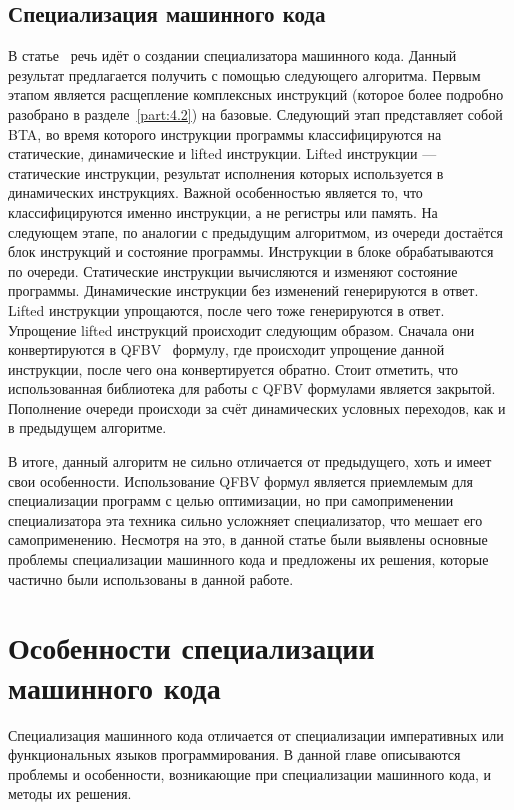 \subsection{Специализация машинного кода}
В статье~\cite{PEMC} речь идёт о создании специализатора машинного кода. Данный результат предлагается получить с помощью следующего алгоритма. Первым этапом является расщепление комплексных инструкций (которое более подробно разобрано в разделе~\ref{part:4.2}) на базовые. Следующий этап представляет собой BTA, во время которого инструкции программы классифицируются на статические, динамические и lifted инструкции. Lifted инструкции --- статические инструкции, результат исполнения которых используется в динамических инструкциях. Важной особенностью является то, что классифицируются именно инструкции, а не регистры или память. На следующем этапе, по аналогии с предыдущим алгоритмом, из очереди достаётся блок инструкций и состояние программы. Инструкции в блоке обрабатываются по очереди. Статические инструкции вычисляются и изменяют состояние программы. Динамические инструкции без изменений генерируются в ответ. Lifted инструкции упрощаются, после чего тоже генерируются в ответ. Упрощение lifted инструкций происходит следующим образом. Сначала они конвертируются в QFBV~\cite{QFBV} формулу, где происходит упрощение данной инструкции, после чего она конвертируется обратно. Стоит отметить, что использованная библиотека для работы с QFBV формулами является закрытой. Пополнение очереди происходи за счёт динамических условных переходов, как и в предыдущем алгоритме.

В итоге, данный алгоритм не сильно отличается от предыдущего, хоть и имеет свои особенности. Использование QFBV формул является приемлемым для специализации программ с целью оптимизации, но при самоприменении специализатора эта техника сильно усложняет специализатор, что мешает его самоприменению. Несмотря на это, в данной статье были выявлены основные проблемы специализации машинного кода и предложены их решения, которые частично были использованы в данной работе. 

\section{Особенности специализации машинного кода}

Специализация машинного кода отличается от специализации императивных или функциональных языков программирования.
В данной главе описываются проблемы и особенности, возникающие при специализации машинного кода, и методы их решения.

